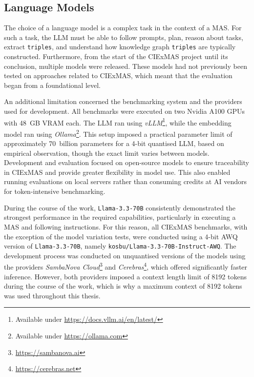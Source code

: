 \documentclass[a4paper,oneside,bibliography=totoc]{scrbook}
\begin{document}
\subsection{Language Models}
\label{subsec:eval_language_models}

The choice of a language model is a complex task in the context of a \ac{MAS}. For such a task, the \ac{LLM} must be able to follow prompts, plan, reason about tasks, extract \texttt{triples}, and understand how knowledge graph \texttt{triples} are typically constructed. Furthermore, from the start of the CIExMAS project until its conclusion, multiple models were released. These models had not previously been tested on approaches related to CIExMAS, which meant that the evaluation began from a foundational level.

An additional limitation concerned the benchmarking system and the providers used for development. All benchmarks were executed on two Nvidia A100 GPUs with 48~GB VRAM each. The \ac{LLM} ran using \textit{vLLM}\footnote{Available under \url{https://docs.vllm.ai/en/latest/}}, while the embedding model ran using \textit{Ollama}\footnote{Available under \url{https://ollama.com}}. This setup imposed a practical parameter limit of approximately 70~billion parameters for a 4-bit quantised \ac{LLM}, based on empirical observation, though the exact limit varies between models. Development and evaluation focused on open-source models to ensure traceability in CIExMAS and provide greater flexibility in model use. This also enabled running evaluations on local servers rather than consuming credits at AI vendors for token-intensive benchmarking.

During the course of the work, \texttt{Llama-3.3-70B} consistently demonstrated the strongest performance in the required capabilities, particularly in executing a \ac{MAS} and following instructions. For this reason, all CIExMAS benchmarks, with the exception of the model variation tests, were conducted using a 4-bit AWQ version of \texttt{Llama-3.3-70B}, namely \texttt{kosbu/Llama-3.3-70B-Instruct-AWQ}. The development process was conducted on unquantised versions of the models using the providers \textit{SambaNova Cloud}\footnote{\url{https://sambanova.ai}} and \textit{Cerebras}\footnote{\url{https://cerebras.net}}, which offered significantly faster inference. However, both providers imposed a context length limit of 8192 tokens during the course of the work, which is why a maximum context of 8192 tokens was used throughout this thesis.
\end{document}
